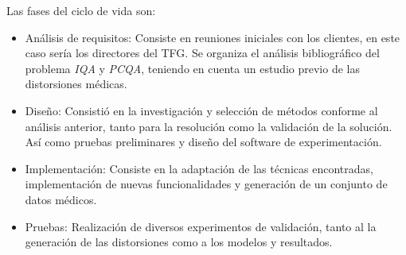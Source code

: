 Las fases del ciclo de vida son: 
\begin{itemize}
  \item Análisis de requisitos: Consiste en reuniones iniciales con los clientes, 
    en este caso sería los directores del TFG. Se organiza el análisis bibliográfico 
    del problema \emph{IQA} y \emph{PCQA}\footnotemark[4], teniendo en cuenta un estudio previo 
    de las distorsiones médicas.
  \item Diseño: Consistió en la investigación y selección de métodos conforme 
    al análisis anterior, tanto para la resolución como la validación de la solución. 
    Así como pruebas preliminares y diseño del software de experimentación. 
  \item Implementación: Consiste en la adaptación de las técnicas encontradas, 
    implementación de nuevas funcionalidades y generación de un conjunto de datos 
    médicos.
  \item Pruebas: Realización de diversos experimentos de validación, tanto al 
    la generación de las distorsiones como a los modelos y resultados.
\end{itemize}
